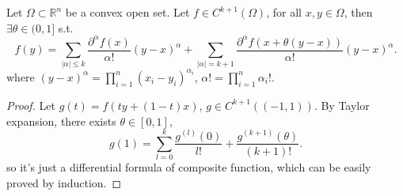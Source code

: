 \begin{theorem}
    Let $\Omega \subset \mathbb{R}^{n}$ be a convex open set.
	Let $f\in C^{k+1}(\Omega)$, for all $x,y\in \Omega$, 
	then $\exists \theta\in (0,1]$ s.t.
	\[
	f(y) = \sum_{|\alpha|\le k} \frac{\partial^\alpha f(x)}{\alpha!}(y-x)^{\alpha}
	+ \sum_{|\alpha|=k+1} \frac{\partial^\alpha f(x+\theta(y-x))}{\alpha!}
	(y-x)^\alpha.
	\]
	where $(y - x)^\alpha = \prod_{i=1}^n(x_i-y_i)^{\alpha_i}$,
	$\alpha! = \prod_{i=1}^n \alpha_i !$.
\end{theorem}
\begin{proof}[Proof]
    Let $g(t) = f(ty + (1-t)x)$, $g\in C^{k+1}((-1,1))$.
	By Taylor expansion, there exists $\theta\in [0,1]$,
	\[
	g(1) = \sum_{l=0}^{k} \frac{g^{(l)}(0)}{l!} + \frac{g^{(k+1)}(\theta)}{(k+1)!}.
	\]
	so it's just a differential formula of composite function,
	which can be easily proved by induction.
\end{proof}

